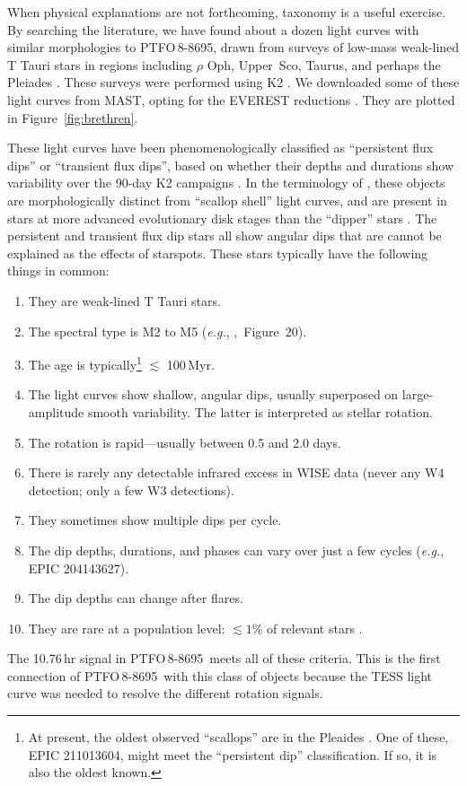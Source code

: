 \documentclass[12pt,twocolumn,tighten]{aastex62}
\newcommand{\ptfo}{PTFO$\,$8-8695}
\begin{document}
When physical explanations are not forthcoming, taxonomy is a useful
exercise.  By searching the literature, we have found about a dozen
light curves with similar morphologies to \ptfo, drawn from surveys of
low-mass weak-lined T Tauri stars in regions including $\rho$ Oph,
Upper~Sco, Taurus, and perhaps the Pleiades
\citep{rebull_rotation_2016,david_transient_2017,stauffer_orbiting_2017,stauffer_rotevol_2018,rebull_usco_2018,rebull_rotation_2020}.
These surveys were performed using K2 \citep{howell_k2_2014}.  We
downloaded some of these light curves from MAST, opting for the EVEREST
reductions \citep{luger_everest_2016,luger_update_2018}.  They are
plotted in Figure~\ref{fig:brethren}.

These light curves have been phenomenologically classified as
``persistent flux dips'' or ``transient flux dips'', based on whether
their depths and durations show variability over the 90-day K2
campaigns \citep{stauffer_orbiting_2017}.  In the terminology of
\citet{stauffer_orbiting_2017}, these objects are morphologically
distinct from ``scallop shell'' light curves, and are present in stars
at more advanced evolutionary disk stages than the ``dipper'' stars
\citep{ansdell_young_2016,cody_manyfaceted_2018}.  The persistent and
transient flux dip stars all show angular dips that are cannot be
explained as the effects of starspots.  These stars typically have the
following things in common:
\begin{enumerate}[topsep=0.5ex,itemsep=-0.5ex,partopsep=1ex,parsep=1.5ex]
  \item They are weak-lined T Tauri stars.
  \item The spectral type is M2 to M5 ({\it e.g.},
    \citealt{rebull_usco_2018},~Figure~20).
  \item The age is typically\footnote{
    At present, the oldest observed ``scallops'' are in the Pleaides
    \citep{rebull_rotation_2016}. One of these, EPIC 211013604, might
    meet the ``persistent dip'' classification.  If so, it is also the
    oldest known.
    } $\lesssim$ 100$\,$Myr.
  \item The light curves show shallow, angular dips, usually superposed
    on large-amplitude smooth variability. The latter is interpreted
    as stellar rotation.
  \item The rotation is rapid---usually between 0.5 and 2.0 days.
  \item There is rarely any detectable infrared excess in WISE data
  (never any W4 detection; only a few W3 detections).
  \item They sometimes show multiple dips per cycle.
  \item The dip depths, durations, and phases can vary over just a few
    cycles ({\it e.g.}, EPIC 204143627).
  \item The dip depths can change after flares.
  \item They are rare at a population level: $\lesssim 1\%$ of relevant stars
    \citep{rebull_usco_2018}.
\end{enumerate}
The 10.76$\,$hr signal in \ptfo\ meets all of these criteria.  This is
the first connection of \ptfo\ with this class of objects because the
TESS light curve was needed to resolve the different rotation signals.
\end{document}
